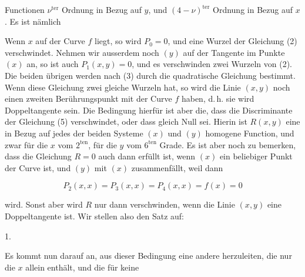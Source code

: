 Functionen $\nu^{\text{ter}}$ Ordnung in Bezug auf $y$, und $(4-\nu)^{\text{ter}}$ Ordnung in Bezug auf $x$. Es ist nämlich


Wenn $x$ auf der Curve $f$ liegt, so wird $P_0=0$, und eine Wurzel der Gleichung (2) verschwindet. Nehmen wir ausserdem noch $(y)$ auf der Tangente im Punkte $(x)$ an, so ist auch $P_1(x,y)=0$, und es verschwinden zwei Wurzeln von (2). Die beiden übrigen werden nach (3) durch die quadratische Gleichung
bestimmt. Wenn diese Gleichung zwei gleiche Wurzeln hat, so wird die Linie $(x,y)$ noch einen zweiten Berührungspunkt mit der Curve $f$ haben, d.\,h. sie wird Doppeltangente sein. Die Bedingung hierfür ist aber die, dass die Discriminante der Gleichung (5) verschwindet, oder dass
gleich Null sei. Hierin ist $R(x,y)$ eine in Bezug auf jedes der beiden Systeme $(x)$ und $(y)$ homogene Function, und zwar für die $x$ vom $2^{\text{ten}}$, für die $y$ vom $6^{\text{ten}}$ Grade. Es ist aber noch zu bemerken, dass die Gleichung $R=0$ auch dann erfüllt ist, wenn $(x)$ ein beliebiger Punkt der Curve ist, und $(y)$ mit $(x)$ zusammenfällt, weil dann

\[
P_2(x,x)=P_3(x,x)=P_4(x,x)=f(x)=0
\]

wird. Sonst aber wird $R$ nur dann verschwinden, wenn die Linie $(x,y)$ eine Doppeltangente ist. Wir stellen also den Satz auf:

1. 

Es kommt nun darauf an, aus dieser Bedingung eine andere herzuleiten, die nur die $x$ allein enthält, und die für keine
